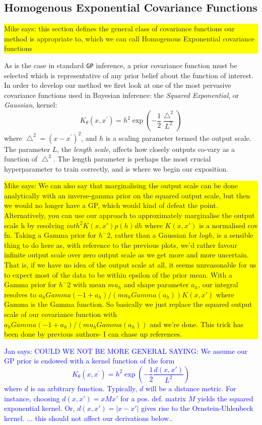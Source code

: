 \documentclass{article}
\newcommand\jansays[1]{\textcolor{blue}{Jan says: #1}}
\newcommand\mikesays[1]{\colorbox{yellow}{\parbox{\columnwidth}{Mike says: #1}}}
\begin{document}
\subsection{Homogenous Exponential Covariance Functions} \mikesays{this section defines the general class of covariance functions our method is appropriate to, which we can call Homogenous Exponential covariance functions}

As is the case in standard \verb"GP" inference, a prior covariance function must be selected which is representative of any prior belief about the function of interest. In order to develop our method we first look at one of the most pervasive covariance functions used in Bayesian inference: the \emph{Squared Exponential}, or \emph{Gaussian}, kernel:
\begin{equation}
K_\theta(x,x^\prime) = h^2 \exp \left( -\frac{1}{2} \frac{\bigtriangleup^2}{L^2} \right)
\end{equation}
where $\bigtriangleup^2 = (x - x^\prime)^2$, and $h$ is a scaling parameter termed the output scale. The parameter $L$, the \emph{length scale}, affects how closely outputs co-vary as a function of $\bigtriangleup^2$. The length parameter is perhaps the most crucial hyperparameter to train correctly, and is where we begin our exposition.

\mikesays{We can also say that marginalising the output scale can be done
analytically with an inverse-gamma prior on the squared output scale,
but then we would no longer have a GP, which would kind of defeat the
point. Alternatively, you can use our approach to approximately
marginalise the output scale h by resolving
$int h^2 K(x, x') p(h) dh$
where $K(x, x')$ is a normalised cov fn. Taking a Gamma prior for $h^-2$,
rather than a Gaussian for  $log h$, is a sensible thing to do here as,
with reference to the previous plots, we'd rather favour infinite
output scale over zero output scale as we get more and more uncertain.
That is, if we have no idea of the output scale at all, it seems
unreasonable for us to expect most of the data to be within epsilon of
the prior mean. With a Gamma prior for $h^-2$ with mean $mu_h$ and shape
parameter $a_h$, our integral resolves to
$a_h Gamma(-1 + a_h) / (mu_h Gamma(a_h) ) K(x, x')$
where Gamma is the Gamma function. So basically we just replace the
squared output scale of our covariance function with $a_h Gamma(-1 +
a_h) / (mu_h Gamma(a_h) )$ and we're done. This trick has been done by previous authors- I can chase up references.}

\jansays{ COULD WE NOT BE MORE GENERAL SAYING:  
We assume our GP prior is endowed with a kernel function of the form 
\begin{equation}
K_\theta(x,x^\prime) = h^2 \exp \left( -\frac{1}{2} \frac{d(x,x')}{L^2} \right)
\end{equation}
where $d$ is an arbitrary function. Typically, $d$ will be a distance metric. For instance, choosing $d(x,x') = x M x'$ for a pos. def. matrix $M$ yields the squared exponential kernel. Or, $d(x,x') = |x-x'|$ gives rise to the Ornstein-Uhlenbeck kernel.
... this should not affect our derivations below..}
\end{document}
